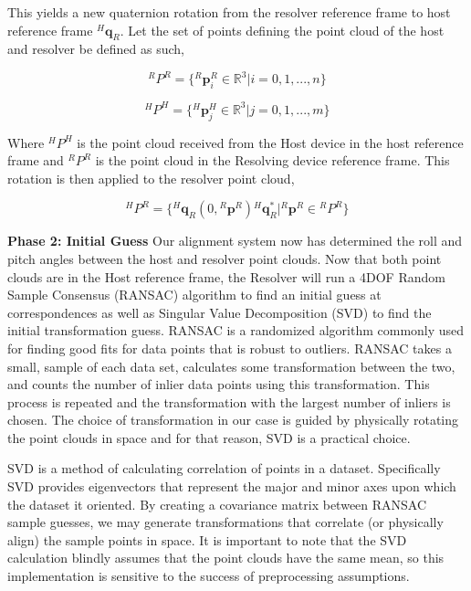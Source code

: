\documentclass{vgtc}                          %
\begin{document}
This yields a new quaternion rotation from the resolver reference frame to host reference frame ${}^H\textbf{q}_R$. Let the set of points defining the point cloud of the host and 
resolver be defined as such,

\begin{equation}
{}^RP^R = \{{}^R\textbf{p}^{R}_i \in \mathbb{R}^3 | i = 0, 1, ..., n\}
\end{equation}

\begin{equation}
    {}^HP^H = \{{}^H\textbf{p}^{H}_j \in \mathbb{R}^3 | j = 0, 1, ..., m\}
\end{equation}

Where ${}^HP^H$ is the point cloud received from the Host device in the host reference frame and ${}^RP^R$ is the point cloud in the 
Resolving device reference frame. This rotation is then applied to the resolver point cloud,

\begin{equation}
{}^HP^{R} = \{ {}^H\textbf{q}_R (0, {}^R\textbf{p}^R){}^H\textbf{q}_R^* | {}^R\textbf{p}^R \in {}^RP^R\}
\end{equation}


{\bf Phase 2: Initial Guess}
Our alignment system now has determined the roll and pitch angles between the host and resolver point clouds. Now that both point clouds 
are in the Host reference frame, the Resolver will run a 4DOF Random Sample Consensus (RANSAC) algorithm to find an initial guess at correspondences
as well as Singular Value Decomposition (SVD) to find the initial transformation guess. RANSAC is a randomized algorithm commonly used for finding good fits 
for data points that is robust to outliers. RANSAC takes a small, sample of each data set, calculates some transformation between the two, and counts the number 
of inlier data points using this transformation. This process is repeated and the transformation with the largest number of inliers is chosen. The choice 
of transformation in our case is guided by physically rotating the point clouds in space and for that reason, SVD is a practical choice.

SVD is a method of calculating correlation of points in a dataset. Specifically SVD provides eigenvectors that represent the major and minor axes 
upon which the dataset it oriented. By creating a covariance matrix between RANSAC sample guesses, we may generate transformations 
that correlate (or physically align) the sample points in space. It is important to note that the SVD calculation blindly assumes that the point clouds 
have the same mean, so this implementation is sensitive to the success of preprocessing assumptions. 
\end{document}
